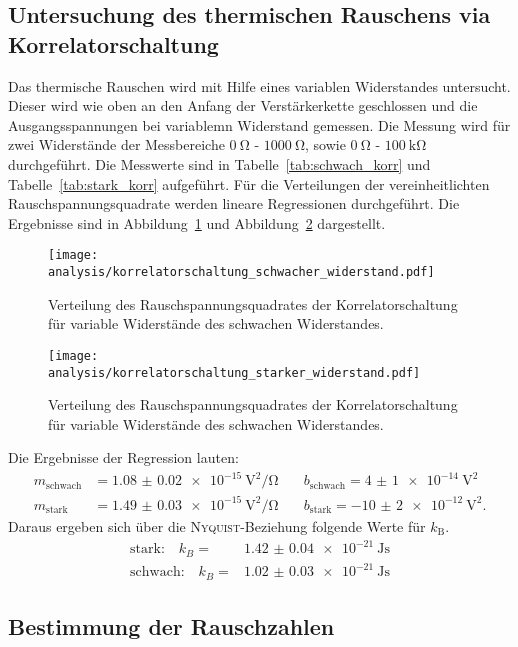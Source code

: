 \subsection{Untersuchung des thermischen Rauschens via Korrelatorschaltung}
%
Das thermische Rauschen wird mit Hilfe eines variablen Widerstandes untersucht. Dieser wird wie oben an den Anfang der Verstärkerkette geschlossen und die Ausgangsspannungen bei variablemn Widerstand gemessen. Die Messung wird für zwei Widerstände der Messbereiche $\SI{0}{\ohm}$ - $\SI{1000}{\ohm}$, sowie $\SI{0}{\ohm}$ - $\SI{100}{\kilo\ohm}$ durchgeführt. Die Messwerte sind in Tabelle~\ref{tab:schwach_korr} und Tabelle~\ref{tab:stark_korr} aufgeführt.
Für die Verteilungen der vereinheitlichten Rauschspannungsquadrate werden lineare Regressionen durchgeführt. Die Ergebnisse sind in Abbildung~\ref{fig:korr_schwach} und Abbildung~\ref{fig:korr_stark} dargestellt.
%
\begin{figure}
  \centering
  \texttt{[image: analysis/korrelatorschaltung\_schwacher\_widerstand.pdf]}
  \caption{Verteilung des Rauschspannungsquadrates der Korrelatorschaltung für variable Widerstände des schwachen Widerstandes.}
  \label{fig:korr_schwach}
\end{figure}
%
\begin{figure}
  \centering
  \texttt{[image: analysis/korrelatorschaltung\_starker\_widerstand.pdf]}
  \caption{Verteilung des Rauschspannungsquadrates der Korrelatorschaltung für variable Widerstände des schwachen Widerstandes.}
  \label{fig:korr_stark}
\end{figure}
%
Die Ergebnisse der Regression lauten:
%
\begin{align*}
  m_\text{schwach}&=\SI{1.08(2)e-15}{\volt\squared\per\ohm} \quad &b_\text{schwach}=\SI{4(1)e-14}{\volt\squared} \\ m_\text{stark}&=\SI{1.49(3)e-15}{\volt\squared\per\ohm} \quad &b_\text{stark}=\SI{-10(2)e-12}{\volt\squared}.
\end{align*}
%
Daraus ergeben sich über die \textsc{Nyquist}-Beziehung folgende Werte für $k_\text{B}$.
%
\begin{align}
  \text{stark:}\quad k_{B}=&\SI{1.42(4)e-21}{\joule\second} \\
  \text{schwach:}\quad k_{B}=&\SI{1.02(3)e-21}{\joule\second}
\end{align}
%
\subsection{Bestimmung der Rauschzahlen}

